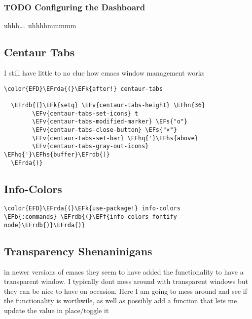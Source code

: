 \documentclass{article}
\newcommand{\EFs}[1]{\textcolor{EFs}{#1}} %
\newcommand{\EFk}[1]{\textcolor{EFk}{#1}} %
\newcommand{\EFb}[1]{\textcolor{EFb}{#1}} %
\newcommand{\EFf}[1]{\textcolor{EFf}{#1}} %
\newcommand{\EFv}[1]{\textcolor{EFv}{#1}} %
\newcommand{\EFhn}[1]{\textcolor{EFhn}{\textbf{#1}}} %
\newcommand{\EFhq}[1]{#1} %
\newcommand{\EFhs}[1]{\textcolor{EFhs}{#1}} %
\newcommand{\EFrda}[1]{\textcolor{EFrda}{#1}} %
\newcommand{\EFrdb}[1]{\textcolor{EFrdb}{#1}} %
\begin{document}
\subsubsection{{\bfseries\sffamily TODO} Configuring the Dashboard}
\label{sec:orge1f256d}
uhhh\ldots{}. uhhhhmmmmm
\subsection{Centaur Tabs}
\label{sec:org0648fd9}
I still have little to no clue how emacs window management works
\begin{Code}
\begin{Verbatim}
\color{EFD}\EFrda{(}\EFk{after!} centaur-tabs

  \EFrdb{(}\EFk{setq} \EFv{centaur-tabs-height} \EFhn{36}
        \EFv{centaur-tabs-set-icons} t
        \EFv{centaur-tabs-modified-marker} \EFs{"o"}
        \EFv{centaur-tabs-close-button} \EFs{"×"}
        \EFv{centaur-tabs-set-bar} \EFhq{'}\EFhs{above}
        \EFv{centaur-tabs-gray-out-icons} \EFhq{'}\EFhs{buffer}\EFrdb{)}
  \EFrda{)}
\end{Verbatim}
\end{Code}

\subsection{Info-Colors}
\label{sec:org16ba1cd}
\begin{Code}
\begin{Verbatim}
\color{EFD}\EFrda{(}\EFk{use-package!} info-colors
\EFb{:commands} \EFrdb{(}\EFf{info-colors-fontify-node}\EFrdb{)}\EFrda{)}
\end{Verbatim}
\end{Code}

\subsection{Transparency Shenaninigans}
\label{sec:orgf18d91c}
in newer versions of emacs they seem to have added the functionality to have a transparent window. I typically dont mess around with transparent windows but they can be nice to have on occasion. Here I am going to mess around and see if the functionality is worthwile, as well as possibly add a function that lets me update the value in place/toggle it
\end{document}
